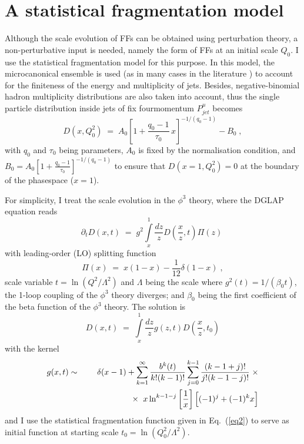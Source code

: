 \documentclass{appolb}
\newcommand{\be}{\begin{equation}}
\newcommand{\ee}[1]{\label{#1} \end{equation}}
\newcommand{\ba}{\begin{eqnarray}}
\newcommand{\ea}[1]{\label{#1} \end{eqnarray}}
\newcommand{\nl}{\nonumber \\}
\begin{document}
\section{A statistical fragmentation model}
\label{sec:relM}
Although the scale evolution of FFs can be obtained using perturbation theory, a non-perturbative input is needed, namely the form of FFs at an initial scale $Q_0$. I use the statistical fragmentation model \cite{bib:UKep3D,bib:UKpp3D} for this purpose. In this model, the microcanonical ensemble is used (as in many cases in the literature \cite{bib:UKpp3D,bib:UKeeFF,bib:UKppFF,bib:UKeeFFstrange,bib:Becattini10,bib:Liu1,bib:Wibig3,bib:FHLiu,bib:Begun3,bib:Begun2,bib:Begun}) to account for the finiteness of the energy and multiplicity of jets. Besides, negative-binomial hadron multiplicity distributions are also taken into account, thus the single particle distribution inside jets of fix fourmomentum $P^\mu_{jet}$ becomes
\be
D\left(x,Q^2_0\right) \;=\; A_0 \left[1 + \frac{q_0-1}{\tau_0}\, x \right]^{-1/(q_0-1)} - B_0 \;,
\ee{eq2}
with $q_0$ and $\tau_0$ being parameters, $A_0$ is fixed by the normalisation condition, and $B_0 = A_0 \left[1 + \frac{q_0-1}{\tau_0} \right]^{-1/(q_0-1)}$ to ensure that $D\left( x=1,Q^2_0\right) = 0$ at the boundary of the phasespace ($x=1$).

For simplicity, I treat the scale evolution in the $\phi^3$ theory, where the DGLAP equation reads 
\be
\partial_t D(x,t) \;=\; g^2 \int\limits_x^1 \frac{dz}{z} D\left(\frac{x}{z},t\right) \Pi(z)\;
\ee{eq3}
with leading-order (LO) splitting function
\be
\Pi(x) \;=\; x(1-x) - \frac{1}{12}\delta(1-x)\;,
\ee{eq4}
scale variable $t = \ln\left(Q^2/\Lambda^2\right)$ and $\Lambda$ being the scale where $g^2(t) = 1/(\beta_0 t)$, the 1-loop coupling of the $\phi^3$ theory diverges; and $\beta_0$ being the first coefficient of the beta function of the $\phi^3$ theory. The solution is  
\be
D(x,t) \;=\; 
\int\limits_x^1 \frac{dz}{z} g\left(z,t\right) D\left(\frac{x}{z},t_0\right)
\ee{eq5}
with the kernel
\ba
g(x,t) &\sim& \delta(x-1) + \sum\limits_{k=1}^\infty \frac{b^k(t)}{k!(k-1)!} \sum\limits_{j=0}^{k-1} \frac{(k-1+j)!}{j!(k-1-j)!} \;\times \nl
&&\hspace{20mm} \times\;\; x \ln^{k-1-j}\left[\frac{1}{x}\right] \Big[ (-1)^j + (-1)^k x \Big]
\ea{eq6}
and I use the statistical fragmentation function given in Eq.~(\ref{eq2}) to serve as initial function at starting scale $t_0 = \ln\left(Q^2_0/\Lambda^2\right)$. 
\end{document}
